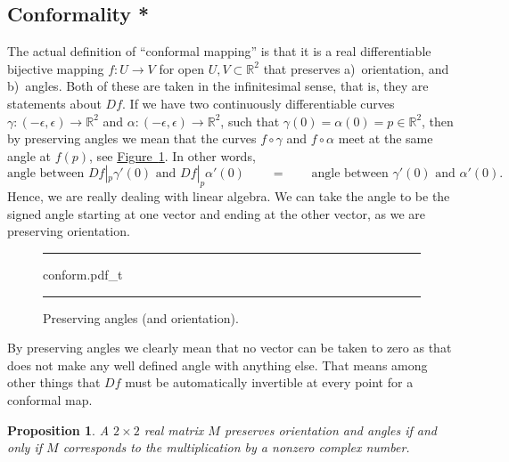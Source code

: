 \documentclass[12pt,openany]{book}
\newcommand{\R}{{\mathbb{R}}}
\theoremstyle{plain}
\newtheorem{prop}[thm]{Proposition}
\theoremstyle{remark}
\theoremstyle{definition}
\newenvironment{myfig}{%
\begin{figure}[h!t]
\noindent\rule{\textwidth}{0.4pt}\vspace{12pt}\par\centering}%
{\par\noindent\rule{\textwidth}{0.4pt}
\end{figure}}
\theoremstyle{exercise}
\theoremstyle{example}
\newcommand{\figureref}[1]{\hyperref[#1]{Figure~\ref*{#1}}}
\begin{document}
\subsection{Conformality *}

The actual definition of ``conformal mapping'' is that it
is a real differentiable bijective mapping $f \colon U \to V$ for open
$U, V \subset \R^2$ that preserves
a)~orientation, and b)~angles.
Both of these are taken in the infinitesimal sense, that is, they are
statements about $Df$.  If we have two continuously differentiable curves
$\gamma \colon (-\epsilon,\epsilon) \to \R^2$ and
$\alpha \colon (-\epsilon,\epsilon) \to \R^2$, such that
$\gamma(0)=\alpha(0) = p \in \R^2$, then by preserving angles we
mean that the curves $f \circ \gamma$ and $f \circ \alpha$ meet at the same
angle at $f(p)$, see \figureref{fig:conform}.  In other words,
\begin{equation*}
\text{angle between } Df|_p \gamma'(0) \text{ and }
Df|_p \alpha'(0)
\qquad = \qquad
\text{angle between } \gamma'(0) \text{ and } \alpha'(0) .
\end{equation*}
Hence, we are really dealing with linear algebra.
We can take the angle to be the signed angle starting at one vector and
ending at the other vector, as we are preserving orientation.

\begin{myfig}
{conform.pdf_t}
\caption{Preserving angles (and orientation).\label{fig:conform}}
\end{myfig}

By preserving angles we clearly mean that no vector can be taken to zero
as that does not make any well defined angle with anything else.  That
means among other things
that $Df$ must be automatically invertible at every point for a conformal map.


\begin{prop}
A $2\times 2$ real matrix $M$
preserves orientation and angles
if and only if $M$ corresponds to the multiplication by a nonzero
complex number.
\end{prop}
\end{document}

